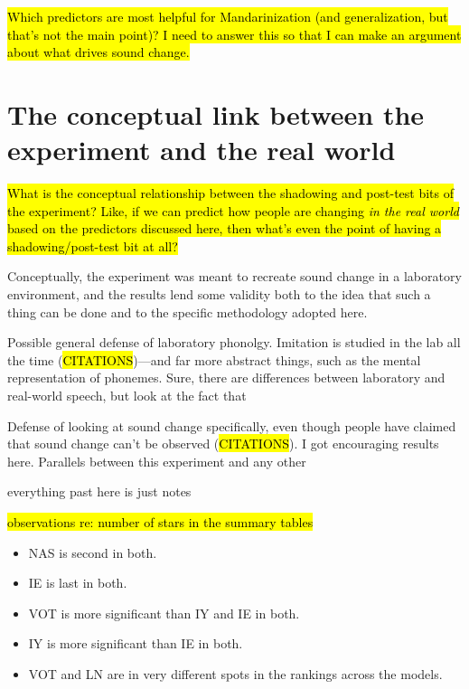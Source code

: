 \hl{Which predictors are most helpful for Mandarinization (and generalization, but that's not the main point)? I need to answer this so that I can make an argument about what drives sound change.}

\section{The conceptual link between the experiment and the real world}
\label{sec:conceptLinkExpIRL}

\hl{What is the conceptual relationship between the shadowing and post-test bits of the experiment? Like, if we can predict how people are changing \textit{in the real world} based on the predictors discussed here, then what's even the point of having a shadowing/post-test bit at all?}

Conceptually, the experiment was meant to recreate sound change in a laboratory environment, and the results lend some validity both to the idea that such a thing can be done and to the specific methodology adopted here.

Possible general defense of laboratory phonolgy. Imitation is studied in the lab all the time (\hl{CITATIONS})---and far more abstract things, such as the mental representation of phonemes. Sure, there are differences between laboratory and real-world speech, but look at the fact that 

Defense of looking at sound change specifically, even though people have claimed that sound change can't be observed (\hl{CITATIONS}). I got encouraging results here. Parallels between this experiment and any other 

\pagebreak

everything past here is just notes

\pagebreak

\hl{observations re: number of stars in the summary tables}
\begin{itemize}
    \item NAS is second in both.
    \item IE is last in both.
    \item VOT is more significant than IY and IE in both.
    \item IY is more significant than IE in both.
    \item VOT and LN are in very different spots in the rankings across the models.
\end{itemize}



